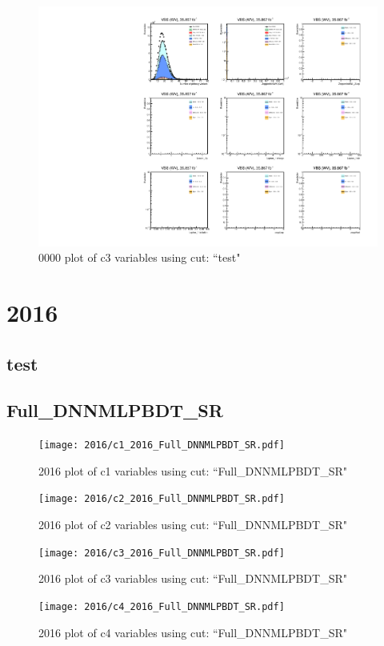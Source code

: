 \documentclass{article}
\begin{document}
                        \begin{figure}[H]
                            \centering
                            \caption{0000 plot of c3 variables using cut: ``test"}
                            \includegraphics[width=\textwidth]{0000/c3_0000_test.pdf}
                        \end{figure}    
    \section*{2016}
      \subsection*{test}
      \subsection*{Full\_DNNMLPBDT\_SR}
                        \begin{figure}[H]
                            \centering
                            \caption{2016 plot of c1 variables using cut: ``Full\_DNNMLPBDT\_SR"}
                            \texttt{[image: 2016/c1\_2016\_Full\_DNNMLPBDT\_SR.pdf]}
                        \end{figure}    
                        \begin{figure}[H]
                            \centering
                            \caption{2016 plot of c2 variables using cut: ``Full\_DNNMLPBDT\_SR"}
                            \texttt{[image: 2016/c2\_2016\_Full\_DNNMLPBDT\_SR.pdf]}
                        \end{figure}    
                        \begin{figure}[H]
                            \centering
                            \caption{2016 plot of c3 variables using cut: ``Full\_DNNMLPBDT\_SR"}
                            \texttt{[image: 2016/c3\_2016\_Full\_DNNMLPBDT\_SR.pdf]}
                        \end{figure}    
                        \begin{figure}[H]
                            \centering
                            \caption{2016 plot of c4 variables using cut: ``Full\_DNNMLPBDT\_SR"}
                            \texttt{[image: 2016/c4\_2016\_Full\_DNNMLPBDT\_SR.pdf]}
                        \end{figure}    
\end{document}
